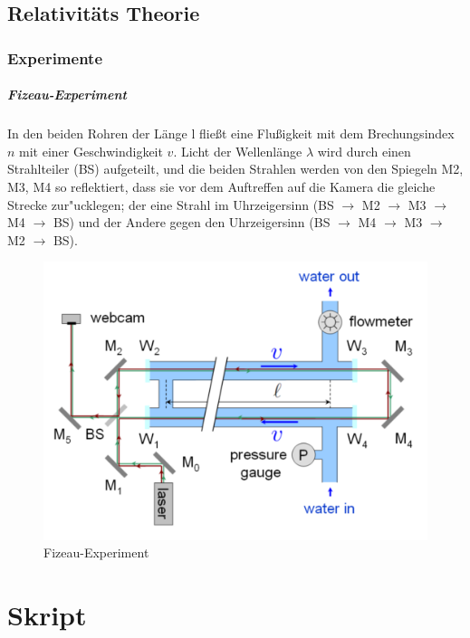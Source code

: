 \documentclass[12pt]{report}
\begin{document}
\section{Relativitäts Theorie}

\subsection{Experimente}
\paragraph{Fizeau-Experiment}

In den beiden Rohren der Länge l fließt eine Flußigkeit mit dem Brechungsindex $n$ mit einer Geschwindigkeit $v$. Licht der Wellenlänge $\lambda$ wird durch einen Strahlteiler (BS) aufgeteilt, und die beiden Strahlen werden von den Spiegeln M2, M3, M4 so reflektiert, dass sie vor dem Auftreffen auf die Kamera die gleiche Strecke zur"ucklegen; der eine Strahl im Uhrzeigersinn (BS $\to$ M2 $\to$ M3 $\to$ M4 $\to$ BS) und der Andere gegen den Uhrzeigersinn (BS $\to$ M4 $\to$ M3 $\to$ M2 $\to$ BS).

\begin{figure}
\centering
\includegraphics[width=.8\textwidth]{Fizz}
\caption{Fizeau-Experiment}
\label{fizz}
\end{figure}


\chapter{Skript}
\end{document}
